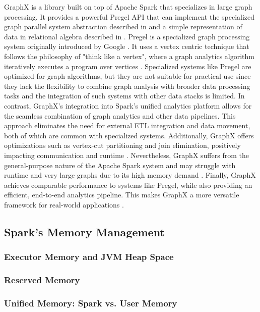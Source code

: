 GraphX is a library built on top of Apache Spark that specializes in large graph processing. It provides a powerful Pregel API that can implement the specialized graph parallel system abstraction described in\cite{malewicz_pregel_2010} and a simple representation of data in relational algebra described in \cite{xin_graphx_2014}. Pregel is a specialized graph processing system originally introduced by Google \cite{malewicz_pregel_2010}. It uses a vertex centric technique that follows the philosophy of "think like a vertex", where a graph analytics algorithm iteratively executes a program over vertices \cite{xin_graphx_2014}. 
Specialized systems like Pregel are optimized for graph algorithms, but they are not suitable for practical use since they lack the flexibility to combine graph analysis with broader data processing tasks and the integration of such systems with other data stacks is limited. In contrast, GraphX's integration into Spark's unified analytics platform allows for the seamless combination of graph analytics and other data pipelines. This approach eliminates the need for external ETL integration and data movement, both of which are common with specialized systems. Additionally, GraphX offers optimizations such as vertex-cut partitioning and join elimination, positively impacting communication and runtime \cite{xin_graphx_2014}. Nevertheless, GraphX suffers from the general-purpose nature of the Apache Spark system and may struggle with runtime and very large graphs due to its high memory demand \cite{zhuo_distributed_2021}.  
Finally, GraphX achieves comparable performance to systems like Pregel, while also providing an efficient, end-to-end analytics pipeline. This makes GraphX a more versatile framework for real-world applications \cite{xin_graphx_2014}.

\subsection{Spark's Memory Management}

\subsubsection{Executor Memory and JVM Heap Space}
\subsubsection{Reserved Memory}
\subsubsection{Unified Memory: Spark vs. User Memory}
